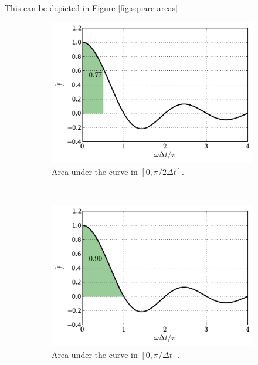 \documentclass[12pt,letterpaper]{article}
\begin{document}
{This can be depicted in Figure \ref{fig:square-areas}
\begin{figure}[h]
    \centering
    \begin{subfigure}[b]{0.45\textwidth}
        \includegraphics[width=\textwidth]{img/square_area=1.pdf}
        \caption{Area under the curve in $[0,\pi/2\Delta t]$.}
    \end{subfigure}\
    \begin{subfigure}[b]{0.45\textwidth}
        \includegraphics[width=\textwidth]{img/square_area=2.pdf}
        \caption{Area under the curve in $[0,\pi/\Delta t]$.}
    \end{subfigure}\\
    \begin{subfigure}[b]{0.45\textwidth}

\end{subfigure}
\end{figure}}
\end{document}

